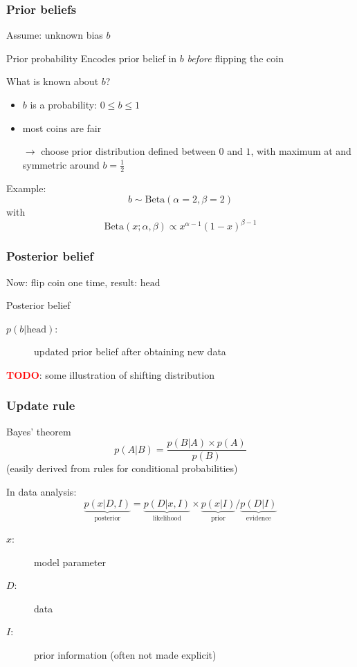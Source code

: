 \documentclass[t]{beamer}
\newcommand{\todo}{\textcolor{red}{\textbf{TODO}}}
\begin{document}
\begin{frame}
  \frametitle{Prior beliefs}
  Assume: unknown bias $b$
  \begin{block}{Prior probability}
    Encodes prior belief in $b$ \textit{before} flipping the coin
  \end{block}
  What is known about $b$?
  \begin{itemize}
  \item $b$ is a probability: $0 \leq b \leq 1$
  \item most coins are fair
  \end{itemize}
  \begin{itemize}
  \item[$\rightarrow$] choose prior distribution defined between $0$ and $1$, with maximum at and symmetric around $b=\frac{1}{2}$
  \end{itemize}
  Example:
  \begin{equation*}
    b \sim \mathrm{Beta}(\alpha=2,\beta=2)
  \end{equation*}
  with
  \begin{equation*}
    \mathrm{Beta}(x;\alpha, \beta) \propto x^{\alpha-1}(1-x)^{\beta-1}
  \end{equation*}
\end{frame}


\begin{frame}
  \frametitle{Posterior belief}
  Now: flip coin one time, result: $\mathrm{head}$
  \begin{block}{Posterior belief}
    \begin{description}
      \item[$p(b|\mathrm{head})$:] updated prior belief after obtaining new data
    \end{description}
  \end{block}
  \todo: some illustration of shifting distribution
\end{frame}


\begin{frame}
  \frametitle{Update rule}
  \begin{block}{Bayes' theorem}
    \begin{equation*}
      p(A|B) = \frac{p(B|A) \times p(A)}{p(B)}
    \end{equation*}
    (easily derived from rules for conditional probabilities)
  \end{block}
  In data analysis:
  \begin{equation*}
    \underbrace{p(x|D,I)}_{\mathrm{posterior}} = \underbrace{p(D|x,I)}_{\mathrm{likelihood}} \times \underbrace{p(x|I)}_{\mathrm{prior}} / \underbrace{p(D|I)}_{\mathrm{evidence}}
  \end{equation*}
  \begin{description}
  \item[$x$:] model parameter
  \item[$D$:] data
  \item[$I$:] prior information (often not made explicit)
  \end{description}
\end{frame}
\end{document}
